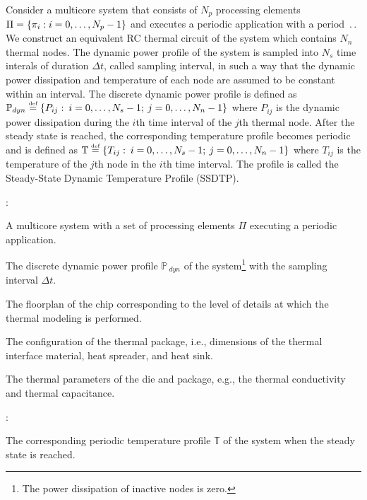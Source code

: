 Consider a multicore system that consists of $N_p$ processing elements $\Pi = \{ \pi_i: i = 0, \dots, N_p - 1 \}$ and executes a periodic application with a period $\period$. We construct an equivalent RC thermal circuit of the system which contains $N_n$ thermal nodes. The dynamic power profile of the system is sampled into $N_s$ time interals of duration $\Delta t$, called sampling interval, in such a way that the dynamic power dissipation and temperature of each node are assumed to be constant within an interval. The discrete dynamic power profile is defined as $\mathbb{P}_{dyn} \eqdef \{ P_{ij}: \: i = \range{0}{N_s - 1}; \: j = \range{0}{N_n - 1} \}$ where $P_{ij}$ is the dynamic power dissipation during the $i$th time interval of the $j$th thermal node. After the steady state is reached, the corresponding temperature profile becomes periodic and is defined as $\mathbb{T} \eqdef \{ T_{ij}: \: i = \range{0 }{N_s - 1}; \: j = \range{0}{N_n - 1} \}$ where $T_{ij}$ is the temperature of the $j$th node in the $i$th time interval. The profile is called the Steady-State Dynamic Temperature Profile (SSDTP).

:
\begin{ilist}
  \item A multicore system with a set of processing elements $\Pi$ executing a periodic application.
  \item The discrete dynamic power profile $\mathbb{P}_{\:dyn}$ of the system\footnote{The power dissipation of inactive nodes is zero.} with the sampling interval $\Delta t$.
  \item The floorplan of the chip corresponding to the level of details at which the thermal modeling is performed.
  \item The configuration of the thermal package, i.e., dimensions of the thermal interface material, heat spreader, and heat sink.
  \item The thermal parameters of the die and package, e.g., the thermal conductivity and thermal capacitance.
\end{ilist}

:
\begin{ilist}
  \item The corresponding periodic temperature profile $\mathbb{T}$ of the system when the steady state is reached.
\end{ilist}
